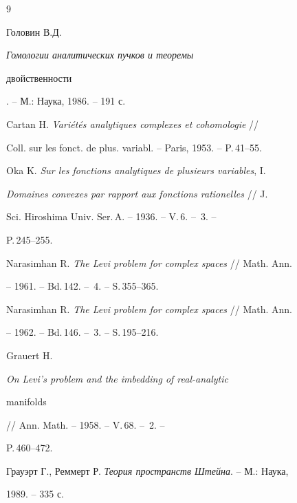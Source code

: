  


\begin{thebibliography}{9} 


 




Головин В.Д. {\em Гомологии аналитических пучков и теоремы 


двойственности}. -- М.: Наука, 1986. -- 191 с. 




Cartan H. {\em Vari\'et\'es analytiques complexes et cohomologie} // 


Coll. sur les fonct. de plus. variabl. -- Paris, 1953. -- P.\,41--55. 




Oka K. {\em Sur les fonctions analytiques de plusieurs variables}, I. 


{\em Domaines convexes par rapport aux fonctions rationelles} // J. 


Sci. Hiroshima Univ. Ser.\,A. -- 1936. -- V.\,6. -- \No\,3. -- 


P.\,245--255. 




Narasimhan R. {\em The Levi problem for complex spaces} // Math. Ann. 


-- 1961. -- Bd.\,142. -- \No\,4. -- S.\,355--365. 




Narasimhan R. {\em The Levi problem for complex spaces} // Math. Ann.  


-- 1962. -- Bd.\,146. -- \No\,3. -- S.\,195--216. 




Grauert H. {\em On Levi's problem and the imbedding of real-analytic 


manifolds} // Ann. Math. -- 1958. -- V.\,68. -- \No\,2. -- 


P.\,460--472. 




Грауэрт Г., Реммерт Р. {\em Теория пространств Штейна}. -- М.: Наука, 


1989. -- 335 с. 


 


\end{thebibliography} 


 


\vskip 2cm 


 






 


\label{end} 


 



